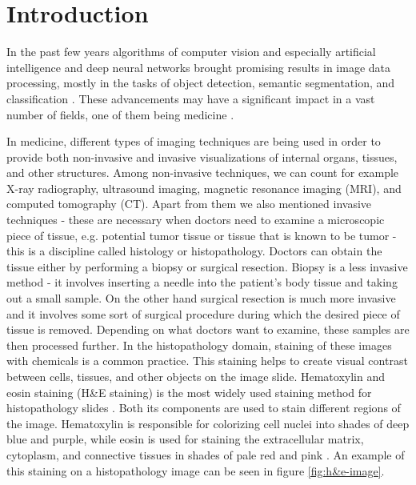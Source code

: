 \chapter{Introduction}


In the past few years algorithms of computer vision and especially artificial intelligence and deep neural networks brought promising results in image data processing, mostly in the tasks of object detection, semantic segmentation, and classification \cite{LeCun2015}. These advancements may have a significant impact in a vast number of fields, one of them being medicine \cite{Hu2023, He2023, Wemmert2021}. 

In medicine, different types of imaging techniques are being used in order to provide both non-invasive and invasive visualizations of internal organs, tissues, and other structures. Among non-invasive techniques, we can count for example X-ray radiography, ultrasound imaging, magnetic resonance imaging (MRI), and computed tomography (CT). Apart from them we also mentioned invasive techniques - these are necessary when doctors need to examine a microscopic piece of tissue, e.g. potential tumor tissue or tissue that is known to be tumor - this is a discipline called histology or histopathology. Doctors can obtain the tissue either by performing a biopsy or surgical resection. Biopsy is a less invasive method - it involves inserting a needle into the patient's body tissue and taking out a small sample. On the other hand surgical resection is much more invasive and it involves some sort of surgical procedure during which the desired piece of tissue is removed. Depending on what doctors want to examine, these samples are then processed further. In the histopathology domain, staining of these images with chemicals is a common practice. This staining helps to create visual contrast between cells, tissues, and other objects on the image slide. Hematoxylin and eosin staining (H\&E staining) is the most widely used staining method for histopathology slides \cite{Dey2022}. Both its components are used to stain different regions of the image. Hematoxylin is responsible for colorizing cell nuclei into shades of deep blue and purple, while eosin is used for staining the extracellular matrix, cytoplasm, and connective tissues in shades of pale red and pink \cite{Dey2022}. An example of this staining on a histopathology image can be seen in figure \ref{fig:h&e-image}.

